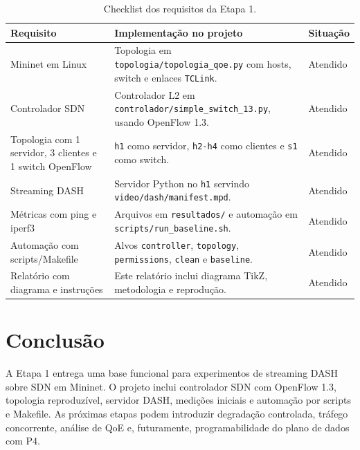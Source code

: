 \documentclass[12pt,a4paper]{article}
\begin{document}
\begin{table}[H]
\centering
\begin{tabular}{p{4.2cm} p{7cm} p{2.4cm}}
\toprule
Requisito & Implementação no projeto & Situação \\
\midrule
Mininet em Linux & Topologia em \texttt{topologia/topologia\_qoe.py} com hosts, switch e enlaces \texttt{TCLink}. & Atendido \\
Controlador SDN & Controlador L2 em \texttt{controlador/simple\_switch\_13.py}, usando OpenFlow 1.3. & Atendido \\
Topologia com 1 servidor, 3 clientes e 1 switch OpenFlow & \texttt{h1} como servidor, \texttt{h2-h4} como clientes e \texttt{s1} como switch. & Atendido \\
Streaming DASH & Servidor Python no \texttt{h1} servindo \texttt{video/dash/manifest.mpd}. & Atendido \\
Métricas com ping e iperf3 & Arquivos em \texttt{resultados/} e automação em \texttt{scripts/run\_baseline.sh}. & Atendido \\
Automação com scripts/Makefile & Alvos \texttt{controller}, \texttt{topology}, \texttt{permissions}, \texttt{clean} e \texttt{baseline}. & Atendido \\
Relatório com diagrama e instruções & Este relatório inclui diagrama TikZ, metodologia e reprodução. & Atendido \\
\bottomrule
\end{tabular}
\caption{Checklist dos requisitos da Etapa 1.}
\end{table}

\section{Conclusão}

A Etapa 1 entrega uma base funcional para experimentos de streaming DASH sobre SDN em Mininet. O projeto inclui controlador SDN com OpenFlow 1.3, topologia reproduzível, servidor DASH, medições iniciais e automação por scripts e Makefile. As próximas etapas podem introduzir degradação controlada, tráfego concorrente, análise de QoE e, futuramente, programabilidade do plano de dados com P4.
\end{document}
